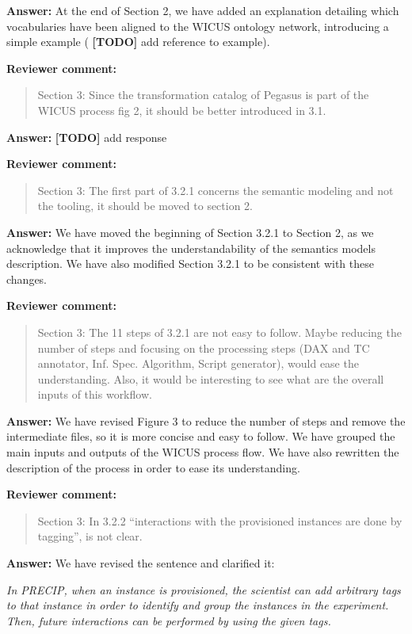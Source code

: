 \documentclass{letter}
\newenvironment{review}%
{\textbf{Reviewer comment:}\begin{quote}}%
{\end{quote}}%
\newcommand{\todo}[1]{%
      \color{red}\textbf{[TODO]} #1\color{black}}
\newcommand{\answer}[1]{%
      \textbf{Answer:} #1}
\newcommand{\revised}[1]{\emph{#1}\color{black}}
\begin{document}
\begin{letter}{}
\answer{At the end of Section 2, we have added an explanation detailing which vocabularies have been aligned to the WICUS ontology network, introducing a simple example (\todo{add reference to example}).}


\begin{review}
Section 3: Since the transformation catalog of Pegasus is part of the WICUS process fig 2, it should be better introduced in 3.1.
\end{review}

\answer{\todo{add response}}


\begin{review}
Section 3: The first part of 3.2.1 concerns the semantic modeling and not the tooling, it should be moved to section 2.
\end{review}

\answer{We have moved the beginning of Section 3.2.1 to Section 2, as we acknowledge that it improves the understandability of the semantics models description. We have also modified Section 3.2.1 to be consistent with these changes.}


\begin{review}
Section 3: The 11 steps of 3.2.1 are not easy to follow. Maybe reducing the number of steps and focusing on the processing steps (DAX and TC annotator, Inf. Spec. Algorithm, Script generator), would ease the understanding. Also, it would be interesting to see what are the overall inputs of this workflow.
\end{review}

\answer{We have revised Figure 3 to reduce the number of steps and remove the intermediate files, so it is more concise and easy to follow. We have grouped the main inputs and outputs of the WICUS process flow. We have also rewritten the description of the process in order to ease its understanding.}


\begin{review}
Section 3: In 3.2.2 ``interactions with the provisioned instances are done by tagging'', is not clear.
\end{review}

\answer{We have revised the sentence and clarified it:}

\revised{In PRECIP, when an instance is provisioned, the scientist can add arbitrary tags to that instance in order to identify and group the instances in the experiment. Then, future interactions can be performed by using the given tags.}



\end{letter}
\end{document}

